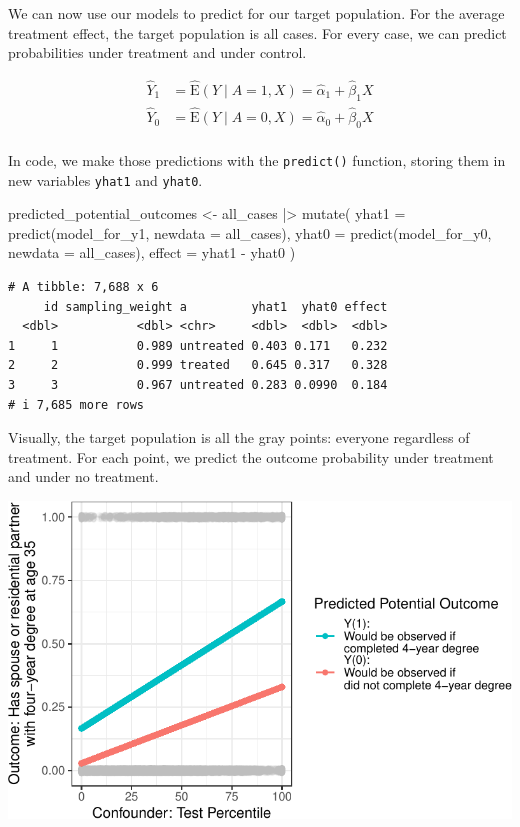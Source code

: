 \documentclass[
  letterpaper,
  DIV=11,
  numbers=noendperiod]{scrartcl}
\newenvironment{Shaded}{\begin{snugshade}}{\end{snugshade}}
\newcommand{\AttributeTok}[1]{\textcolor[rgb]{0.40,0.45,0.13}{#1}}
\newcommand{\FunctionTok}[1]{\textcolor[rgb]{0.28,0.35,0.67}{#1}}
\newcommand{\NormalTok}[1]{\textcolor[rgb]{0.00,0.23,0.31}{#1}}
\newcommand{\OtherTok}[1]{\textcolor[rgb]{0.00,0.23,0.31}{#1}}
\newcommand{\SpecialCharTok}[1]{\textcolor[rgb]{0.37,0.37,0.37}{#1}}
\begin{document}
We can now use our models to predict for our target population. For the
average treatment effect, the target population is all cases. For every
case, we can predict probabilities under treatment and under control.

\[
\begin{aligned}
\hat{Y}_1 &= \hat{\text{E}}(Y\mid A = 1, X) = \hat\alpha_1 + \hat\beta_1 X \\
\hat{Y}_0 &= \hat{\text{E}}(Y\mid A = 0, X) = \hat\alpha_0 + \hat\beta_0 X \\
\end{aligned}
\]

In code, we make those predictions with the \texttt{predict()} function,
storing them in new variables \texttt{yhat1} and \texttt{yhat0}.

\begin{Shaded}
\begin{Highlighting}[]
\NormalTok{predicted\_potential\_outcomes }\OtherTok{\textless{}{-}}\NormalTok{ all\_cases }\SpecialCharTok{|\textgreater{}}
  \FunctionTok{mutate}\NormalTok{(}
    \AttributeTok{yhat1 =} \FunctionTok{predict}\NormalTok{(model\_for\_y1, }\AttributeTok{newdata =}\NormalTok{ all\_cases),}
    \AttributeTok{yhat0 =} \FunctionTok{predict}\NormalTok{(model\_for\_y0, }\AttributeTok{newdata =}\NormalTok{ all\_cases),}
    \AttributeTok{effect =}\NormalTok{ yhat1 }\SpecialCharTok{{-}}\NormalTok{ yhat0}
\NormalTok{  )}
\end{Highlighting}
\end{Shaded}

\begin{verbatim}
# A tibble: 7,688 x 6
     id sampling_weight a         yhat1  yhat0 effect
  <dbl>           <dbl> <chr>     <dbl>  <dbl>  <dbl>
1     1           0.989 untreated 0.403 0.171   0.232
2     2           0.999 treated   0.645 0.317   0.328
3     3           0.967 untreated 0.283 0.0990  0.184
# i 7,685 more rows
\end{verbatim}

Visually, the target population is all the gray points: everyone
regardless of treatment. For each point, we predict the outcome
probability under treatment and under no treatment.

\includegraphics{models_for_causal_files/figure-pdf/unnamed-chunk-11-1.pdf}
\end{document}
